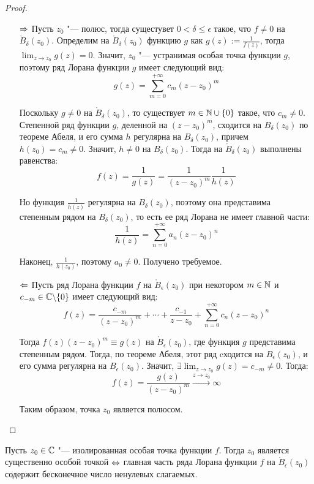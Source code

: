 \begin{proof}~
	\begin{itemize}
		\item[$\Rightarrow$]Пусть $z_0$ "--- полюс, тогда сущестувет $0 < \delta \le \epsilon$ такое, что $f \ne 0$ на $\mathring B_\delta(z_0)$. Определим на $\mathring B_\delta(z_0)$ функцию $g$ как $g(z) := \frac1{f(z)}$, тогда $\lim_{z \to z_0}g(z) = 0$. Значит, $z_0$ "--- устранимая особая точка функции $g$, поэтому ряд Лорана функции $g$ имеет следующий вид:
		\[g(z) = \sum_{m = 0}^{+\infty}c_m(z - z_0)^m\]
		
		Поскольку $g \ne 0$ на $\mathring B_\delta(z_0)$, то существует $m \in \mathbb{N} \cup \{0\}$ такое, что $c_m \ne 0$. \pagebreak Степенной ряд функции ${g}$, деленной на ${(z - z_0)^m}$, сходится на $B_\delta(z_0)$ по теореме Абеля, и его сумма $h$ регулярна на $B_\delta(z_0)$, причем $h(z_0) = c_m \ne 0$. Значит, $h \ne 0$ на $B_\delta(z_0)$. Тогда на $\mathring B_\delta(z_0)$ выполнены равенства:
		\[f(z) = \frac{1}{g(z)} = \frac1{(z - z_0)^m}\frac1{h(z)}\]
		
		Но функция $\frac1{h(z)}$ регулярна на $B_\delta(z_0)$, поэтому она представима степенным рядом на $B_\delta(z_0)$, то есть ее ряд Лорана не имеет главной части:
		\[\frac{1}{h(z)} = \sum_{n=0}^{+\infty}a_n(z - z_0)^n\]
		
		Наконец, $\frac1{h(z_0)}$, поэтому $a_0 \ne 0$. Получено требуемое.
		
		\item[$\Leftarrow$] Пусть ряд Лорана функции $f$ на $\mathring B_\epsilon(z_0)$ при некотором $m \in \mathbb{N}$ и $c_{-m} \in \mathbb{C} \backslash \{0\}$ имеет следующий вид:
		\[f(z) = \frac{c_{-m}}{(z-z_0)^m} + \dotsb + \frac{c_{-1}}{z-z_0} + \sum_{n = 0}^{+\infty}c_n(z - z_0)^n\]
		
		Тогда $f(z)(z-z_0)^m \equiv g(z)$ на $\mathring B_\epsilon(z_0)$, где функция $g$ представима степенным рядом. Тогда, по теореме Абеля, этот ряд cходится на $B_\epsilon(z_0)$, и его сумма регулярна на $B_\epsilon(z_0)$. Значит, $\exists\lim_{z \to z_0} g(z) = c_{-m} \ne 0$. Тогда:
		\[f(z) = \frac{g(z)}{(z - z_0)^m} \xrightarrow{z \to z_0} \infty\]
		
		Таким образом, точка $z_0$ является полюсом.\qedhere
	\end{itemize}
\end{proof}

\begin{corollary}
	Пусть $z_0 \in \mathbb{C}$ "--- изолированная особая точка функции $f$. Тогда $z_0$ является существенно особой точкой $\Leftrightarrow$ главная часть ряда Лорана функции $f$ на $\mathring B_\epsilon(z_0)$ содержит бесконечное число ненулевых слагаемых.
\end{corollary}

